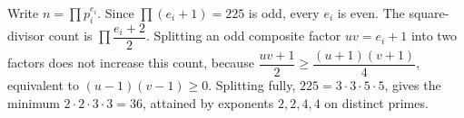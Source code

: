 Write $n=\prod p_i^{e_i}$. Since $\prod(e_i+1)=225$ is odd, every $e_i$ is even. The square-divisor count is $\prod\dfrac{e_i+2}{2}$. Splitting an odd composite factor $uv=e_i+1$ into two factors does not increase this count, because $\dfrac{uv+1}{2}\ge\dfrac{(u+1)(v+1)}{4}$, equivalent to $(u-1)(v-1)\ge0$. Splitting fully, $225=3\cdot3\cdot5\cdot5$, gives the minimum $2\cdot2\cdot3\cdot3=\boxed{36}$, attained by exponents $2,2,4,4$ on distinct primes.
